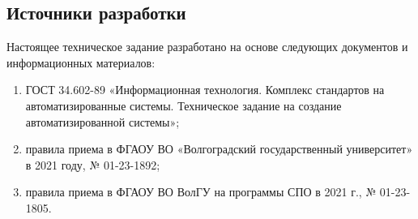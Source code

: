 \subsection{Источники разработки}

Настоящее техническое задание разработано на основе следующих документов и информационных материалов:

\begin{enumerate} 
  \item ГОСТ 34.602-89 «Информационная технология. Комплекс стандартов на автоматизированные системы. Техническое задание на создание автоматизированной системы»;
  
  \item правила приема в ФГАОУ ВО «Волгоградский государственный университет» в 2021 году, № 01-23-1892;
  
  \item правила приема в ФГАОУ ВО ВолГУ на программы СПО в 2021 г., № 01-23-1805.
\end{enumerate}